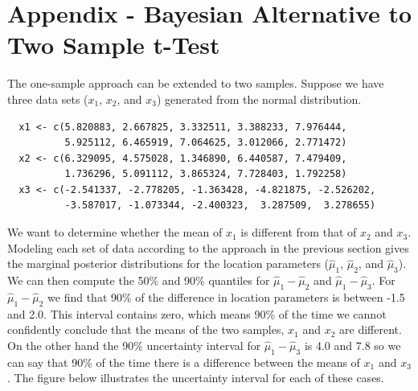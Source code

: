 \documentclass[12pt]{article}
\begin{document}
\pagebreak

\section{Appendix - Bayesian Alternative to Two Sample t-Test}

The one-sample approach can be extended to two samples. Suppose we have three data sets ($x_1$, $x_2$, and $x_3$) generated from the normal distribution.

\begin{verbatim}
  x1 <- c(5.820883, 2.667825, 3.332511, 3.388233, 7.976444,
          5.925112, 6.465919, 7.064625, 3.012066, 2.771472)
  x2 <- c(6.329095, 4.575028, 1.346890, 6.440587, 7.479409,
          1.736296, 5.091112, 3.865324, 7.728403, 1.792258)
  x3 <- c(-2.541337, -2.778205, -1.363428, -4.821875, -2.526202,
          -3.587017, -1.073344, -2.400323,  3.287509,  3.278655)
\end{verbatim}

\noindent We want to determine whether the mean of $x_1$ is different from that of $x_2$ and $x_3$. Modeling each set of data according to the approach in the previous section gives the marginal posterior distributions for the location parameters ($\hat{\mu}_1$, $\hat{\mu}_2$, and $\hat{\mu}_3$). We can then compute the 50\% and 90\% quantiles for $\hat{\mu}_1 - \hat{\mu}_2$ and $\hat{\mu}_1 - \hat{\mu}_3$. For $\hat{\mu}_1 - \hat{\mu}_2$ we find that 90\% of the difference in location parameters is between -1.5 and 2.0. This interval contains zero, which means 90\% of the time we cannot confidently conclude that the means of the two samples, $x_1$ and $x_2$ are different. On the other hand the 90\% uncertainty interval for $\hat{\mu}_1 - \hat{\mu}_3$ is 4.0 and 7.8 so we can say that 90\% of the time there is a difference between the means of $x_1$ and $x_3$. The figure below illustrates the uncertainty interval for each of these cases.
\end{document}

